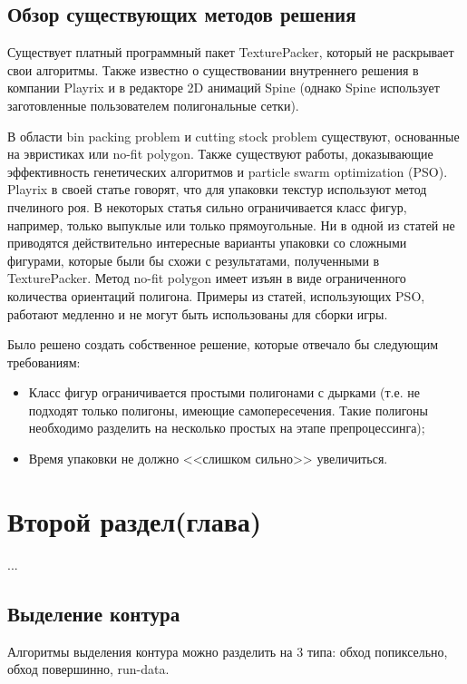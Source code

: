 \documentclass{fefu_thesis/cls/fefu}
\begin{document}
    \subsection{Обзор существующих методов решения}
    Существует платный программный пакет TexturePacker\cite{TexturePacker}, который не раскрывает свои алгоритмы. Также известно о существовании внутреннего решения в компании Playrix\cite{PlayrixArticle} и в редакторе 2D анимаций Spine\cite{Spine} (однако Spine использует заготовленные пользователем полигональные сетки).

    В области bin packing problem и cutting stock problem существуют, основанные на эвристиках\cite{Heuristic1}\cite{Heuristic2}\cite{Heuristic3} или no-fit polygon\cite{NFP1}\cite{NFP2}. Также существуют работы, доказывающие эффективность генетических алгоритмов\cite{Genetica1} и particle swarm optimization (PSO)\cite{PSO1}\cite{PSO2}. Playrix в своей статье\cite{PlayrixArticle} говорят, что для упаковки текстур используют метод пчелиного роя. В некоторых статья сильно ограничивается класс фигур, например, только выпуклые или только прямоугольные. Ни в одной из статей не приводятся действительно интересные варианты упаковки со сложными фигурами, которые были бы схожи с результатами, полученными в TexturePacker. Метод no-fit polygon имеет изъян в виде ограниченного количества ориентаций полигона. Примеры из статей, использующих PSO, работают медленно и не могут быть использованы для сборки игры.

    Было решено создать собственное решение, которые отвечало бы следующим требованиям:
    \begin{itemize}
        \item Класс фигур ограничивается простыми полигонами с дырками (т.е. не подходят только полигоны, имеющие самопересечения. Такие полигоны необходимо разделить на несколько простых на этапе препроцессинга);
        \item Время упаковки не должно <<слишком сильно>> увеличиться.
    \end{itemize}
    \section{Второй раздел(глава)}
    ...
    \subsection{Выделение контура}
    Алгоритмы выделения контура можно разделить на 3 типа: обход попиксельно, обход повершинно, run-data.
\end{document}
